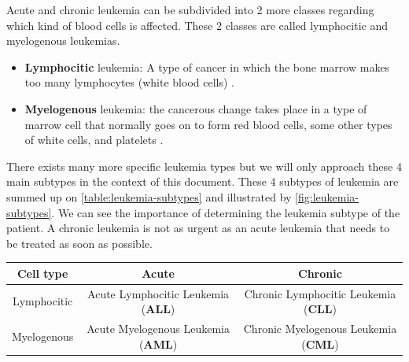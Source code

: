 \documentclass[11pt, openany]{report}
\theoremstyle{plain}
\theoremstyle{definition}
\theoremstyle{remark}
\begin{document}
Acute and chronic leukemia can be subdivided into 2 more classes regarding which kind of blood cells is affected. These 2 classes are called lymphocitic and myelogenous leukemias. 

\begin{itemize}
\item \textbf{Lymphocitic} leukemia: A type of cancer in which the bone marrow makes too many lymphocytes (white blood cells) \cite{NCI}. 
\item \textbf{Myelogenous} leukemia: the cancerous change takes place in a type of marrow cell that normally goes on to form red blood cells, some other types of white cells, and platelets \cite{wiki-leukemia}. 
\end{itemize} 

There exists many more specific leukemia types but we will only approach these 4 main subtypes in the context of this document. These 4 subtypes of leukemia are summed up on \autoref{table:leukemia-subtypes} and illustrated by \autoref{fig:leukemia-subtypes}. 
We can see the importance of determining the leukemia subtype of the patient. A chronic leukemia is not as urgent as an acute leukemia that needs to be treated as soon as possible. 

\begin{center}
    \begin{tabular}{|c|c|c|}
      \hline
      Cell type & Acute & Chronic \\
      \hline
      Lymphocitic & Acute Lymphocitic Leukemia (\textbf{ALL}) & Chronic Lymphocitic Leukemia (\textbf{CLL})  \\
      \hline
      Myelogenous & Acute Myelogenous Leukemia (\textbf{AML})  & Chronic Myelogenous Leukemia (\textbf{CML})  \\
      \hline
    \end{tabular}
    \label{table:leukemia-subtypes}
\end{center}
\end{document}
